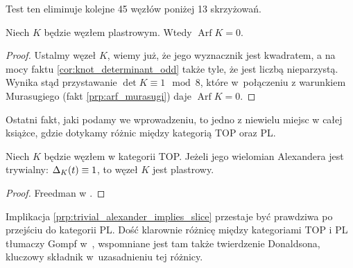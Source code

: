 Test ten eliminuje kolejne 45 węzłów poniżej 13 skrzyżowań.

\begin{proposition}
    Niech $K$ będzie węzłem plastrowym.
    Wtedy $\operatorname{Arf} K = 0$.
\end{proposition}

\begin{proof}
    Ustalmy węzeł $K$, wiemy już, że jego wyznacznik jest kwadratem, a na mocy faktu \ref{cor:knot_determinant_odd} także tyle, że jest liczbą nieparzystą.
    Wynika stąd przystawanie $\det K \equiv 1 \mod 8$, które w~połączeniu z warunkiem Murasugiego (fakt \ref{prp:arf_murasugi}) daje $\operatorname{Arf} K = 0$.
\end{proof}


Ostatni fakt, jaki podamy we wprowadzeniu, to jedno z niewielu miejsc w całej książce, gdzie dotykamy różnic między kategorią TOP oraz PL.

\begin{proposition}
\label{prp:trivial_alexander_implies_slice}%
    Niech $K$ będzie węzłem w kategorii TOP.
    Jeżeli jego wielomian Alexandera jest trywialny: $\Delta_K(t) \equiv 1$, to węzeł $K$ jest plastrowy.
\end{proposition}

\begin{proof}
%
    Freedman w \cite[tw. 1.13]{freedman82}.
\end{proof}

Implikacja \ref{prp:trivial_alexander_implies_slice} przestaje być prawdziwa po przejściu do kategorii PL.
Dość klarownie różnicę między kategoriami TOP i PL tłumaczy Gompf w~\cite{gompf86}, wspomniane jest tam także twierdzenie Donaldsona, kluczowy składnik w~uzasadnieniu tej różnicy.
%









